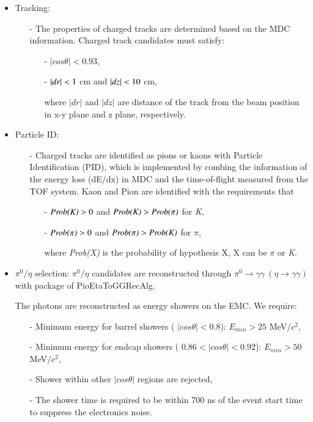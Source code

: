 \begin{itemize}
	\item Tracking:
		\begin{itemize}
			\item[-] The properties of charged tracks are determined based on the MDC information. Charged track candidates must satisfy:
				\begin{itemize}
					\item[-] $|cos\theta| < 0.93$, 
                    \item[-] $|dr| < \boldmath 1 $ cm and $|dz| < \boldmath 10$ cm,

						where $|dr|$ and $|dz|$ are distance of the track from the beam position in x-y plane and z plane, respectively.
				\end{itemize}
		\end{itemize}
	\item Particle ID:
		\begin{itemize}
			\item[-] Charged tracks are identified as pions or kaons with Particle Identification (PID), which is implemented by combing the information of the energy loss (dE/dx) in MDC and the time-of-flight measured from
				the TOF system. Kaon and Pion are identified with the requirements that 
				\begin{itemize}
					\item[-] $\emph{Prob(K)} > 0$ and $\emph{Prob(K)} > \emph{Prob($\pi$)}$ for \emph{K},
					\item[-] $\emph{Prob($\pi$)} > 0$ and $\emph{Prob($\pi$)} > \emph{Prob(K)}$ for \emph{$\pi$},
						
                        where \emph{Prob(X)} is the probability of hypothesis X, X can be \emph{$\pi$} or \emph{K}.
				\end{itemize}
		\end{itemize}
    \item $\pi^{0}/\eta$ selection: $\pi^{0}/\eta$ candidates are reconstructed through $\pi^{0} \rightarrow \gamma\gamma\ (\eta \rightarrow \gamma\gamma)$ with package of PioEtaToGGRecAlg.
		

		The photons are reconstructed as energy showers on the EMC. We require:
		\begin{itemize}
			\item[-] Minimum energy for barrel showers ( $|cos\theta| < 0.8$): $E_{min} >25$ MeV/$c^{2}$,
			\item[-] Minimum energy for endcap showers ( $0.86 < |cos\theta| < 0.92$): $E_{min} >50$ MeV$/c^{2}$,
			\item[-] Shower within other $|cos\theta|$ regions are rejected,
			\item[-] The shower time is required to be within 700 ns of the event start time to suppress the electronics noise. 
		\end{itemize}


\end{itemize}
